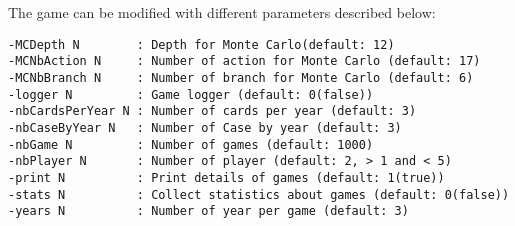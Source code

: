 The game can be modified with different parameters described below:

\begin{verbatim}
-MCDepth N        : Depth for Monte Carlo(default: 12)
-MCNbAction N     : Number of action for Monte Carlo (default: 17)
-MCNbBranch N     : Number of branch for Monte Carlo (default: 6)
-logger N         : Game logger (default: 0(false))
-nbCardsPerYear N : Number of cards per year (default: 3)
-nbCaseByYear N   : Number of Case by year (default: 3)
-nbGame N         : Number of games (default: 1000)
-nbPlayer N       : Number of player (default: 2, > 1 and < 5)
-print N          : Print details of games (default: 1(true))
-stats N          : Collect statistics about games (default: 0(false))
-years N          : Number of year per game (default: 3)
\end{verbatim}
